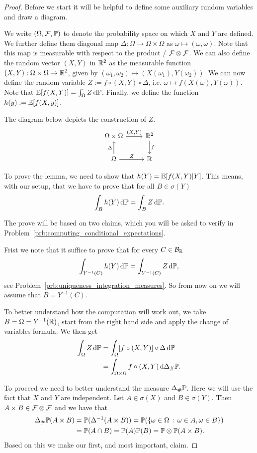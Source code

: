 \begin{proof}
Before we start it will be helpful to define some auxiliary random variables and draw a diagram.

We write $(\Omega, \mathcal F, \mathbb P)$ to denote the probability space on which $X$ and $Y$ are defined. We further define them diagonal map $\Delta : \Omega \to \Omega \times \Omega$ as $\omega \mapsto (\omega, \omega)$. Note that this map is measurable with respect to the product \sigalg/ $\mathcal F \otimes \mathcal F$. We can also define the random vector $(X,Y)$ in $\mathbb R^2$ as the measurable function $(X, Y) : \Omega \times \Omega \to \mathbb R^2$, given by $(\omega_1, \omega_2) \mapsto (X(\omega_1), Y(\omega_2))$. We can now define the random variable $Z := f \circ (X, Y) \circ \Delta$, i.e. $\omega \mapsto f(X(\omega), Y(\omega))$. Note that $\mathbb E[f(X,Y)] = \int_\Omega Z \, \mathrm{d} \mathbb P$. Finally, we define the function $h(y) := \mathbb E[f(X,y)]$.

The diagram below depicts the construction of $Z$.
\[
\begin{tikzcd}
	\Omega \times \Omega \arrow[r,"{(X,Y)}"] &\bbR^2 \arrow[d,"f"]  \\
	\Omega \arrow[u, "\Delta"] \arrow[r, "Z"] &\bbR
\end{tikzcd}
\]

To prove the lemma, we need to show that $h(Y) = \mathbb E[f(X,Y)|Y]$. This means, with our setup, that we have to prove that for all $B \in \sigma(Y)$ 
\[
	\int_B h(Y) \, \mathrm{d} \mathbb P = \int_B Z \, \mathrm{d} \mathbb P.
\]

The prove will be based on two claims, which you will be asked to verify in Problem~\ref{prb:computing_conditional_expectations}.

Frist we note that it suffice to prove that for every $C \in \mathcal B_{\mathbb R}$
\[
	\int_{Y^{-1}(C)} h(Y) \, \mathrm{d} \mathbb P = \int_{Y^{-1}(C)} Z \, \mathrm{d} \mathbb P,
\]
see Problem~\ref{prb:uniqueness_integration_measures}. So from now on we will assume that $B = Y^{-1}(C)$.

To better understand how the computation will work out, we take $B = \Omega = Y^{-1}(\mathbb R)$, start from the right hand side and apply the change of variables formula. We then get
\begin{align*}
	\int_\Omega Z \, \mathrm{d} \mathbb P &= \int_\Omega [f \circ (X, Y)] \circ \Delta \, \mathrm{d} \mathbb P \\
	&= \int_{\Omega \times \Omega} f \circ (X,Y) \, \mathrm{d} \Delta_\# \mathbb P.
\end{align*}

To proceed we need to better understand the measure $\Delta_\# \mathbb P$. Here we will use the fact that $X$ and $Y$ are independent. Let $A \in \sigma(X)$ and $B \in \sigma(Y)$. Then $A \times B \in \mathcal F \otimes \mathcal F$ and we have that
\begin{align*}
	\Delta_\# \mathbb P(A \times B) &= \mathbb P(\Delta^{-1}(A \times B))
		= \mathbb P(\{\omega \in \Omega \, : \, \omega \in A, \omega \in B\})\\
	&= \mathbb P(A \cap B) = \mathbb P(A) \mathbb P(B) = \mathbb P\otimes \mathbb P(A\times B).
\end{align*}
Based on this we make our first, and most important, claim.


\end{proof}
